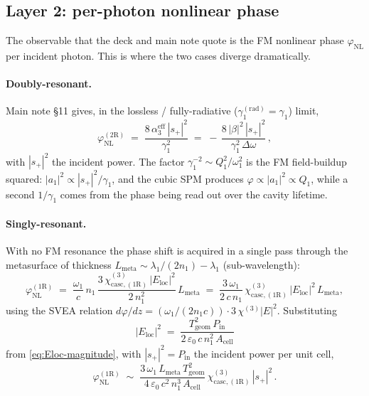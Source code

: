 \documentclass[11pt,a4paper]{article}
\newcommand{\eps}{\varepsilon}
\newcommand{\chithree}{\chi^{(3)}}
\newcommand{\Dom}{\Delta\omega}
\newcommand{\chicascOneR}{\chi^{(3)}_{\text{casc},(1\mathrm R)}}
\begin{document}
\subsection*{Layer 2: per-photon nonlinear phase}

The observable that the deck and main note quote is the FM nonlinear phase
$\varphi_\text{NL}$ per incident photon.  This is where the two cases
diverge dramatically.

\paragraph{Doubly-resonant.}
Main note \S 11 gives, in the lossless / fully-radiative
($\gamma_1^{(\text{rad})}=\gamma_1$) limit,
\begin{equation}
  \varphi_\text{NL}^{(2\mathrm R)}\;=\;
   \frac{8\,\alpha_3^\text{eff}\,|s_+|^{2}}{\gamma_1^{2}}
   \;=\;-\,\frac{8\,|\beta|^{2}\,|s_+|^{2}}{\gamma_1^{2}\,\Dom}\,,
  \label{eq:phi-2R}
\end{equation}
with $|s_+|^{2}$ the incident power.  The factor $\gamma_1^{-2}\sim
Q_1^{2}/\omega_1^{2}$ is the FM field-buildup squared:
$|a_1|^{2}\propto |s_+|^{2}/\gamma_1$, and the cubic SPM produces
$\varphi\propto|a_1|^{2}\propto Q_1$, while a second $1/\gamma_1$ comes
from the phase being read out over the cavity lifetime.

\paragraph{Singly-resonant.}
With no FM resonance the phase shift is acquired in a single pass through
the metasurface of thickness $L_\text{meta}\sim\lambda_1/(2 n_1)\!-\!\lambda_1$
(sub-wavelength):
\begin{equation}
  \varphi_\text{NL}^{(1\mathrm R)}
   \;=\;\frac{\omega_1}{c}\,n_1\,
        \frac{3\,\chicascOneR\,|E_\text{loc}|^{2}}{2\,n_1^{2}}\,L_\text{meta}
   \;=\;\frac{3\,\omega_1}{2\,c\,n_1}\,
        \chicascOneR\,|E_\text{loc}|^{2}\,L_\text{meta},
  \label{eq:phi-1R}
\end{equation}
using the SVEA relation
$d\varphi/dz=(\omega_1/(2 n_1 c))\cdot 3\,\chithree |E|^{2}$.
Substituting
\begin{equation*}
  |E_\text{loc}|^{2}\;=\;\frac{T_\text{geom}^{2}\,P_\text{in}}
                              {2\,\eps_0\,c\,n_1^{2}\,A_\text{cell}}
\end{equation*}
from \eqref{eq:Eloc-magnitude}, with $|s_+|^{2}=P_\text{in}$ the incident
power per unit cell,
\begin{equation}
  \varphi_\text{NL}^{(1\mathrm R)}
   \;\sim\;\frac{3\,\omega_1\,L_\text{meta}\,T_\text{geom}^{2}}
               {4\,\eps_0\,c^{2}\,n_1^{3}\,A_\text{cell}}\,
           \chicascOneR\,|s_+|^{2}\,.
  \label{eq:phi-1R-pow}
\end{equation}
\end{document}
